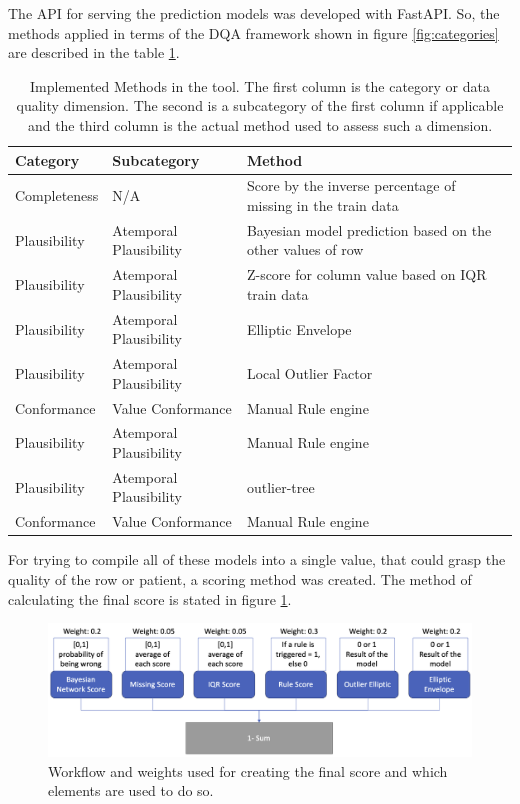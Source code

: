 The API for serving the prediction models was developed with FastAPI. So, the methods applied in terms of the DQA framework shown in figure \ref{fig:categories} are described in the table \ref{tab:methods}.

\begin{table}[htpb]
\caption{Implemented Methods in the tool. The first column is the category or data quality dimension. The second is a subcategory of the first column if applicable and the third column is the actual method used to assess such a dimension.} \label{tab:methods}
\renewcommand{\arraystretch}{1.4}
\setlength{\tabcolsep}{10pt}

\begin{tabularx}{\textwidth}{ p{2cm} p{3.5cm} X }
\hline
 Category   & Subcategory           & Method   \\ \hline
Completeness     & N/A               & Score by the inverse percentage of missing in the train data         \\ 
Plausibility & Atemporal Plausibility & Bayesian model prediction based on the other values of row \\ 
Plausibility & Atemporal Plausibility         & Z-score for column value based on IQR train data       \\    
Plausibility & Atemporal Plausibility           & Elliptic Envelope                       \\ 
Plausibility & Atemporal Plausibility           & Local Outlier Factor                \\ 
Conformance & Value Conformance           & Manual Rule engine                           \\ 
Plausibility & Atemporal Plausibility           & Manual Rule engine                      \\ 
Plausibility & Atemporal Plausibility           & outlier-tree                      \\ 
Conformance & Value Conformance & Manual Rule engine\\
\hline
\end{tabularx}

\end{table}


For trying to compile all of these models into a single value, that could grasp the quality of the row or patient, a scoring method was created. The method of calculating the final score is stated in figure \ref{fig:scoring_method}. 
\begin{figure}[htbp]
    \centering
    \caption{Workflow and weights used for creating the final score and which elements are used to do so.}\label{fig:scoring_method} 
    \includegraphics[scale=0.29]{imgs/score-method.png}
    \end{figure}


